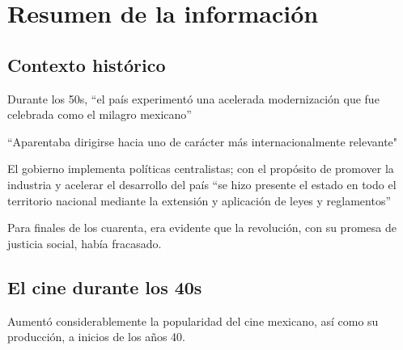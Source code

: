 \section{Resumen de la información}
\subsection{Contexto histórico}
\begin{compactitem}
    \item Durante los 50s, ``el país experimentó una acelerada modernización que fue celebrada como el milagro mexicano”\autocite{SoledadLoaeza2010}
    \item ``Aparentaba dirigirse hacia uno de carácter más internacionalmente relevante"\autocite[1]{Kehoe2013}
    \item El gobierno implementa políticas centralistas; con el propósito de promover la industria y acelerar el desarrollo del país ``se hizo presente el estado en todo el territorio nacional mediante la extensión y aplicación de leyes y reglamentos'' \autocite{SoledadLoaeza2010}
    \item Para finales de los cuarenta, era evidente que la revolución, con su  promesa de justicia social, había fracasado.\autocite[1]{jones_bunuel_2006} 
\end{compactitem} 
\subsection{El cine durante los 40s}
\begin{compactitem}
     \item Aumentó considerablemente la popularidad del cine mexicano, así como su producción, a inicios de los años 40.\autocite[522]{peter_desarrollo_2008}

\end{compactitem} 
